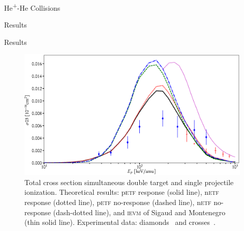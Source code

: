 \documentclass[letterpaper, 11 pt]{report}
\begin{document}
\begin{chapter}{\texorpdfstring{He\textsuperscript{+}}{He+}-He Collisions \label{chap:hephe}}
\begin{section}{Results \label{sec:hephe-disc}}
\begin{subsection}{Results \label{sec:hephe-res}}
         \begin{figure}[t]
            \centering
            \includegraphics[width = \linewidth]{./images/hephe-cross/HepHe-003.eps}
            \caption[Total cross section simultaneous double target and single projectile ionization in
                     He\textsuperscript{+}-He collisions.]
                    {Total cross section simultaneous double target and single projectile ionization.
                     Theoretical results: p\textsc{etf} response (solid line), n\textsc{etf} response
                                          (dotted line), p\textsc{etf} no-response (dashed line),
                                          n\textsc{etf} no-response (dash-dotted line), and
                                          \textsc{ievm} of Sigaud and Montenegro~\cite{SM-03} (thin
                                          solid line).
                     Experimental data: diamonds~\cite{Dub-89} and crosses~\cite{SSMSM-11}.
                     \label{fig:cs003}}
         \end{figure}


\end{subsection}
\end{section}
\end{chapter}
\end{document}
